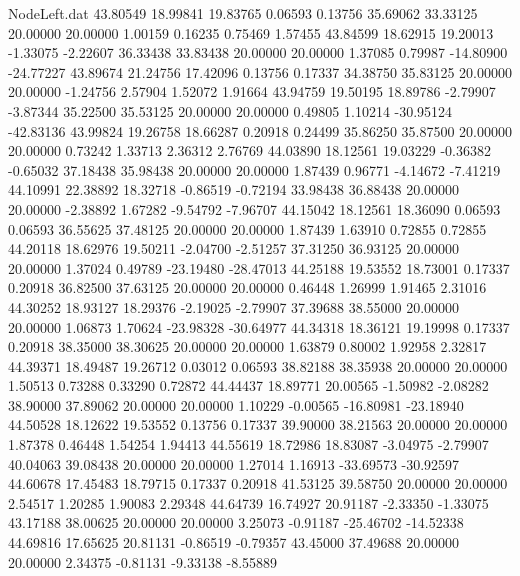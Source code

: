 \begin{filecontents}{NodeLeft.dat}
  43.80549   18.99841   19.83765     0.06593    0.13756   35.69062   33.33125   20.00000   20.00000    1.00159    0.16235    0.75469    1.57455
  43.84599   18.62915   19.20013    -1.33075   -2.22607   36.33438   33.83438   20.00000   20.00000    1.37085    0.79987  -14.80900  -24.77227
  43.89674   21.24756   17.42096     0.13756    0.17337   34.38750   35.83125   20.00000   20.00000   -1.24756    2.57904    1.52072    1.91664
  43.94759   19.50195   18.89786    -2.79907   -3.87344   35.22500   35.53125   20.00000   20.00000    0.49805    1.10214  -30.95124  -42.83136
  43.99824   19.26758   18.66287     0.20918    0.24499   35.86250   35.87500   20.00000   20.00000    0.73242    1.33713    2.36312    2.76769
  44.03890   18.12561   19.03229    -0.36382   -0.65032   37.18438   35.98438   20.00000   20.00000    1.87439    0.96771   -4.14672   -7.41219
  44.10991   22.38892   18.32718    -0.86519   -0.72194   33.98438   36.88438   20.00000   20.00000   -2.38892    1.67282   -9.54792   -7.96707
  44.15042   18.12561   18.36090     0.06593    0.06593   36.55625   37.48125   20.00000   20.00000    1.87439    1.63910    0.72855    0.72855
  44.20118   18.62976   19.50211    -2.04700   -2.51257   37.31250   36.93125   20.00000   20.00000    1.37024    0.49789  -23.19480  -28.47013
  44.25188   19.53552   18.73001     0.17337    0.20918   36.82500   37.63125   20.00000   20.00000    0.46448    1.26999    1.91465    2.31016
  44.30252   18.93127   18.29376    -2.19025   -2.79907   37.39688   38.55000   20.00000   20.00000    1.06873    1.70624  -23.98328  -30.64977
  44.34318   18.36121   19.19998     0.17337    0.20918   38.35000   38.30625   20.00000   20.00000    1.63879    0.80002    1.92958    2.32817
  44.39371   18.49487   19.26712     0.03012    0.06593   38.82188   38.35938   20.00000   20.00000    1.50513    0.73288    0.33290    0.72872
  44.44437   18.89771   20.00565    -1.50982   -2.08282   38.90000   37.89062   20.00000   20.00000    1.10229   -0.00565  -16.80981  -23.18940
  44.50528   18.12622   19.53552     0.13756    0.17337   39.90000   38.21563   20.00000   20.00000    1.87378    0.46448    1.54254    1.94413
  44.55619   18.72986   18.83087    -3.04975   -2.79907   40.04063   39.08438   20.00000   20.00000    1.27014    1.16913  -33.69573  -30.92597
  44.60678   17.45483   18.79715     0.17337    0.20918   41.53125   39.58750   20.00000   20.00000    2.54517    1.20285    1.90083    2.29348
  44.64739   16.74927   20.91187    -2.33350   -1.33075   43.17188   38.00625   20.00000   20.00000    3.25073   -0.91187  -25.46702  -14.52338
  44.69816   17.65625   20.81131    -0.86519   -0.79357   43.45000   37.49688   20.00000   20.00000    2.34375   -0.81131   -9.33138   -8.55889

\end{filecontents}
